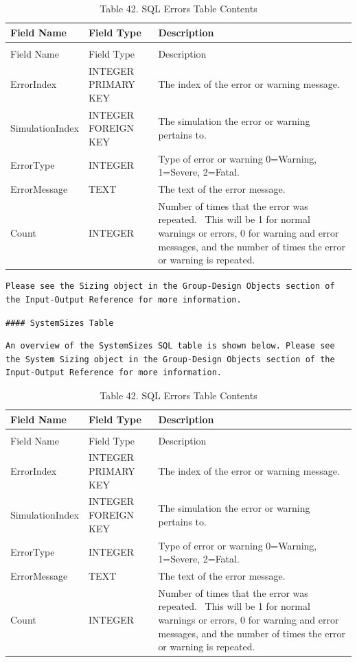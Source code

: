 \begin{longtable}[c]{p{1.5in}p{1.5in}p{2.99in}}
\caption{Table 42. SQL Errors Table Contents \label{table:table-42.-sql-errors-table-contents}} \tabularnewline
\toprule 
Field Name & Field Type & Description \tabularnewline
\midrule
\endfirsthead

\caption[]{Table 42. SQL Errors Table Contents} \tabularnewline
\toprule 
Field Name & Field Type & Description \tabularnewline
\midrule
\endhead

ErrorIndex & INTEGER PRIMARY KEY & The index of the error or warning message. \tabularnewline
SimulationIndex & INTEGER FOREIGN KEY & The simulation the error or warning pertains to. \tabularnewline
ErrorType & INTEGER & Type of error or warning 0=Warning, 1=Severe, 2=Fatal. \tabularnewline
ErrorMessage & TEXT & The text of the error message. \tabularnewline
Count & INTEGER & Number of times that the error was repeated.~ This will be 1 for normal warnings or errors, 0 for warning and error messages, and the number of times the error or warning is repeated. \tabularnewline
\bottomrule
\end{longtable}

\begin{lstlisting}
Please see the Sizing object in the Group-Design Objects section of the Input-Output Reference for more information.
\end{lstlisting}

\begin{lstlisting}
#### SystemSizes Table
\end{lstlisting}

\begin{lstlisting}
An overview of the SystemSizes SQL table is shown below. Please see the System Sizing object in the Group-Design Objects section of the Input-Output Reference for more information.
\end{lstlisting}

\begin{longtable}[c]{p{1.5in}p{1.5in}p{2.99in}}
\caption{Table 42. SQL Errors Table Contents \label{table:table-42.-sql-errors-table-contents}} \tabularnewline
\toprule 
Field Name & Field Type & Description \tabularnewline
\midrule
\endfirsthead

\caption[]{Table 42. SQL Errors Table Contents} \tabularnewline
\toprule 
Field Name & Field Type & Description \tabularnewline
\midrule
\endhead

ErrorIndex & INTEGER PRIMARY KEY & The index of the error or warning message. \tabularnewline
SimulationIndex & INTEGER FOREIGN KEY & The simulation the error or warning pertains to. \tabularnewline
ErrorType & INTEGER & Type of error or warning 0=Warning, 1=Severe, 2=Fatal. \tabularnewline
ErrorMessage & TEXT & The text of the error message. \tabularnewline
Count & INTEGER & Number of times that the error was repeated.~ This will be 1 for normal warnings or errors, 0 for warning and error messages, and the number of times the error or warning is repeated. \tabularnewline
\bottomrule
\end{longtable}

